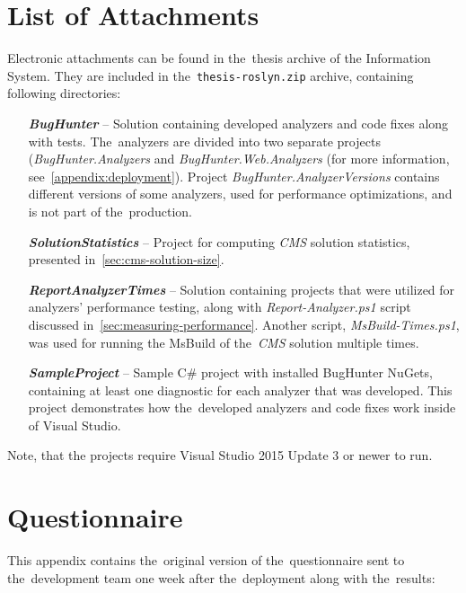 \documentclass[
  digital, %
  table,   %
  lof,     %
  lot,     %
  oneside,
]{fithesis3}
\begin{document}
\chapter{List of Attachments}
\label{appendix:source-codes}
Electronic attachments can be found in the~thesis archive of the Information System. They are included in the~\texttt{thesis-roslyn.zip} archive, containing following directories:

\begin{itemize}
\item[\textit{\textbf{BugHunter}}] -- Solution containing developed analyzers and code fixes along with tests. The~analyzers are divided into two separate projects (\textit{BugHunter.Analyzers} and \textit{BugHunter.Web.Analyzers} (for more information, see~\ref{appendix:deployment}). Project \textit{BugHunter.AnalyzerVersions} contains different versions of some analyzers, used for performance optimizations, and is not part of the~production.

\item[\textit{\textbf{SolutionStatistics}}] -- Project for computing \textit{CMS} solution statistics, presented in~\ref{sec:cms-solution-size}.

\item[\textit{\textbf{ReportAnalyzerTimes}}] -- Solution containing projects that were utilized for analyzers' performance testing, along with \textit{Report-Analyzer.ps1} script discussed in~\ref{sec:measuring-performance}. Another script, \textit{MsBuild-Times.ps1}, was used for running the MsBuild of the~\textit{CMS} solution multiple times.

\item[\textit{\textbf{SampleProject}}] -- Sample C\# project with installed BugHunter NuGets, containing at least one diagnostic for each analyzer that was developed. This project demonstrates how the~developed analyzers and code fixes work inside of Visual Studio.
\end{itemize}

Note, that the projects require Visual Studio 2015 Update 3 or newer to run. 

\chapter{Questionnaire}
\label{appendix:questionnaire}
This appendix contains the~original version of the~questionnaire sent to the~development team one week after the~deployment along with the~results:
\end{document}
